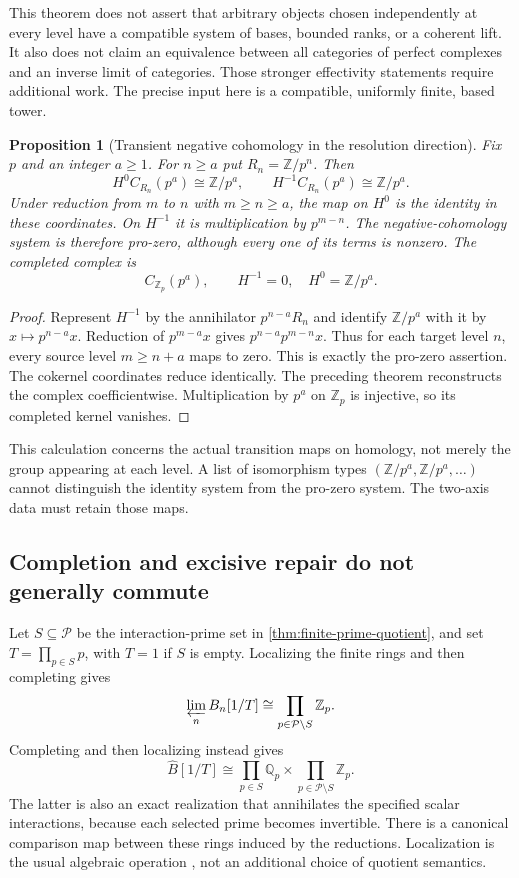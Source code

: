 \documentclass[11pt]{article}
\newtheorem{proposition}[theorem]{Proposition}
\theoremstyle{definition}
\theoremstyle{remark}
\begin{document}
This theorem does not assert that arbitrary objects chosen independently at every level have a compatible system of bases, bounded ranks, or a coherent lift. It also does not claim an equivalence between all categories of perfect complexes and an inverse limit of categories. Those stronger effectivity statements require additional work. The precise input here is a compatible, uniformly finite, based tower.

\begin{proposition}[Transient negative cohomology in the resolution direction]\label{prop:transient-koszul}
Fix $p$ and an integer $a\geq1$. For $n\geq a$ put $R_n=\mathbb Z/p^n$. Then
\[
 H^0C_{R_n}(p^a)\cong\mathbb Z/p^a,
 \qquad H^{-1}C_{R_n}(p^a)\cong\mathbb Z/p^a.
\]
Under reduction from $m$ to $n$ with $m\geq n\geq a$, the map on $H^0$ is the identity in these coordinates. On $H^{-1}$ it is multiplication by $p^{m-n}$. The negative-cohomology system is therefore pro-zero, although every one of its terms is nonzero. The completed complex is
\[
 C_{\mathbb Z_p}(p^a),\qquad
 H^{-1}=0,\quad H^0=\mathbb Z/p^a.
\]
\end{proposition}
\begin{proof}
Represent $H^{-1}$ by the annihilator $p^{n-a}R_n$ and identify $\mathbb Z/p^a$ with it by $x\mapsto p^{n-a}x$. Reduction of $p^{m-a}x$ gives $p^{n-a}p^{m-n}x$. Thus for each target level $n$, every source level $m\geq n+a$ maps to zero. This is exactly the pro-zero assertion. The cokernel coordinates reduce identically. The preceding theorem reconstructs the complex coefficientwise. Multiplication by $p^a$ on $\mathbb Z_p$ is injective, so its completed kernel vanishes.
\end{proof}

This calculation concerns the actual transition maps on homology, not merely the group appearing at each level. A list of isomorphism types $(\mathbb Z/p^a,\mathbb Z/p^a,\ldots)$ cannot distinguish the identity system from the pro-zero system. The two-axis data must retain those maps.

\subsection{Completion and excisive repair do not generally commute}

Let $S\subseteq\mathcal P$ be the interaction-prime set in \cref{thm:finite-prime-quotient}, and set $T=\prod_{p\in S}p$, with $T=1$ if $S$ is empty. Localizing the finite rings and then completing gives
\[
 \varprojlim_n B_n[1/T]\cong\prod_{p\in\mathcal P\setminus S}\mathbb Z_p.
\]
Completing and then localizing instead gives
\[
 \widehat B[1/T]\cong
 \prod_{p\in S}\mathbb Q_p\times
 \prod_{p\in\mathcal P\setminus S}\mathbb Z_p.
\]
The latter is also an exact realization that annihilates the specified scalar interactions, because each selected prime becomes invertible. There is a canonical comparison map between these rings induced by the reductions. Localization is the usual algebraic operation \cite{StacksLocalization}, not an additional choice of quotient semantics.
\end{document}
